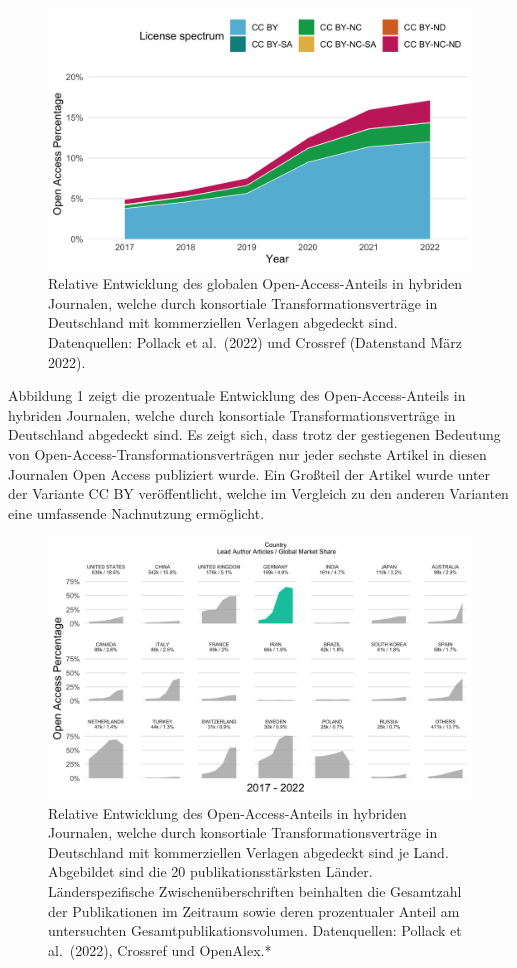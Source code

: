 \documentclass[a4paper,
fontsize=11pt,
oneside,
numbers=noperiodatend,
parskip=half-,
bibliography=totoc,
final
]{scrartcl}
\begin{document}
\begin{figure}
\centering
\includegraphics{fig/fig_1.png}
\caption{Relative Entwicklung des globalen
Open-Access-Anteils in hybriden Journalen, welche durch konsortiale
Transformationsverträge in Deutschland mit kommerziellen Verlagen
abgedeckt sind. Datenquellen: Pollack et al.~(2022) und Crossref
(Datenstand März 2022).}
\end{figure}

Abbildung 1 zeigt die prozentuale Entwicklung des Open-Access-Anteils in
hybriden Journalen, welche durch konsortiale Transformationsverträge in
Deutschland abgedeckt sind. Es zeigt sich, dass trotz der gestiegenen
Bedeutung von Open-Access-Transformationsverträgen nur jeder sechste
Artikel in diesen Journalen Open Access publiziert wurde. Ein Großteil
der Artikel wurde unter der Variante CC BY veröffentlicht, welche im
Vergleich zu den anderen Varianten eine umfassende Nachnutzung
ermöglicht.

\begin{figure}
\centering
\includegraphics{fig/fig_2.png}
\caption{Relative Entwicklung des Open-Access-Anteils in
hybriden Journalen, welche durch konsortiale Transformationsverträge in
Deutschland mit kommerziellen Verlagen abgedeckt sind je Land.
Abgebildet sind die 20 publikationsstärksten Länder. Länderspezifische
Zwischenüberschriften beinhalten die Gesamtzahl der Publikationen im
Zeitraum sowie deren prozentualer Anteil am untersuchten
Gesamtpublikationsvolumen. Datenquellen: Pollack et al.~(2022), Crossref
und OpenAlex.*}
\end{figure}
\end{document}
